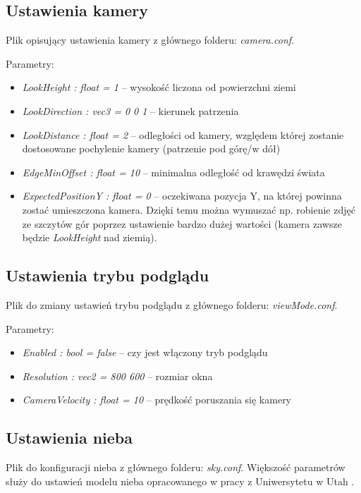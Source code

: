 \documentclass[inz,shortabstract]{iithesis}
\begin{document}
        \subsection{Ustawienia kamery} \label{cameraConfig}
        Plik opisujący ustawienia kamery z głównego folderu: \textit{camera.conf}.
        
        Parametry:
        \begin{itemize}
            \item \textit{LookHeight : float = 1} -- wysokość liczona od  powierzchni ziemi 
            \item \textit{LookDirection : vec3 = 0 0 1} -- kierunek patrzenia 
            \item \textit{LookDistance : float = 2} -- odległości od kamery, względem której zostanie dostosowane pochylenie kamery (patrzenie pod górę/w dół)
            \item \textit{EdgeMinOffset : float = 10} -- minimalna odległość od krawędzi świata  
            \item \textit{ExpectedPositionY : float = 0} -- oczekiwana pozycja Y, na której powinna zostać umieszczona kamera. Dzięki temu można wymuszać np. robienie zdjęć ze szczytów gór poprzez ustawienie bardzo dużej wartości (kamera zawsze będzie \textit{LookHeight} nad ziemią). 
        \end{itemize}
        
        \subsection{Ustawienia trybu podglądu} \label{viewModeConfig}
        Plik do zmiany ustawień trybu podglądu z głównego folderu: \textit{viewMode.conf}.
        
        Parametry:
        \begin{itemize}
            \item \textit{Enabled : bool = false} -- czy jest włączony tryb podglądu
            \item \textit{Resolution : vec2 = 800 600} -- rozmiar okna 
            \item \textit{CameraVelocity : float = 10} -- prędkość poruszania się kamery 
        \end{itemize}
        
        \subsection{Ustawienia nieba}
        Plik do konfiguracji nieba z głównego folderu: \textit{sky.conf}. Większość parametrów służy do ustawień modelu nieba opracowanego w pracy z Uniwersytetu w Utah \cite{sky}.
        
\end{document}
